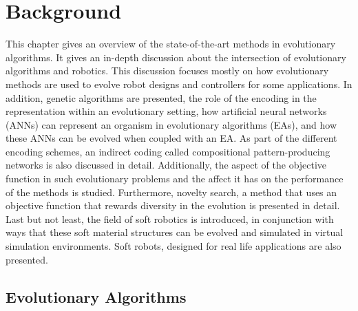 
\chapter{Background} %

\label{Background} %


This chapter gives an overview of the state-of-the-art methods in evolutionary algorithms. It gives an in-depth discussion about the intersection of evolutionary algorithms and robotics. This discussion focuses mostly on how evolutionary methods are used to evolve robot designs and controllers for some applications. In addition, genetic algorithms are presented, the role of the encoding in the representation within an evolutionary setting,  how artificial neural networks (ANNs) can represent an organism in evolutionary algorithms (EAs), and how these ANNs can be evolved when coupled with an EA. As part of the different encoding schemes, an indirect coding called compositional pattern-producing networks is also discussed in detail. Additionally, the aspect of the objective function in such evolutionary problems and the affect it has on the performance of the methods is studied. Furthermore, novelty search, a method that uses an objective function that rewards diversity in the evolution is presented in detail. Last but not least, the field of soft robotics  is introduced, in conjunction with ways that these soft material structures can be evolved and simulated in virtual simulation environments. Soft robots, designed for real life applications are also presented.




\section{Evolutionary Algorithms}

